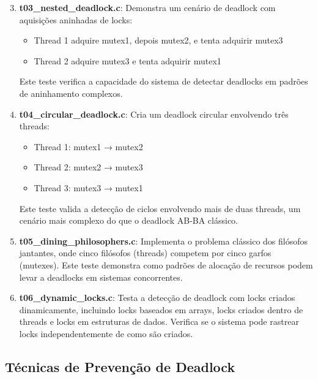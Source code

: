 \begin{enumerate}\setcounter{enumi}{2}
    \item \textbf{t03\_nested\_deadlock.c}: Demonstra um cenário de deadlock com aquisições aninhadas de locks:
    \begin{itemize}
        \item Thread 1 adquire mutex1, depois mutex2, e tenta adquirir mutex3
        \item Thread 2 adquire mutex3 e tenta adquirir mutex1
    \end{itemize}
    Este teste verifica a capacidade do sistema de detectar deadlocks em padrões de aninhamento complexos.

    \item \textbf{t04\_circular\_deadlock.c}: Cria um deadlock circular envolvendo três threads:
    \begin{itemize}
        \item Thread 1: mutex1 → mutex2
        \item Thread 2: mutex2 → mutex3
        \item Thread 3: mutex3 → mutex1
    \end{itemize}
    Este teste valida a detecção de ciclos envolvendo mais de duas threads, um cenário mais complexo do que o deadlock AB-BA clássico.

    \item \textbf{t05\_dining\_philosophers.c}: Implementa o problema clássico dos filósofos jantantes, onde cinco filósofos (threads) competem por cinco garfos (mutexes). Este teste demonstra como padrões de alocação de recursos podem levar a deadlocks em sistemas concorrentes.

    \item \textbf{t06\_dynamic\_locks.c}: Testa a detecção de deadlock com locks criados dinamicamente, incluindo locks baseados em arrays, locks criados dentro de threads e locks em estruturas de dados. Verifica se o sistema pode rastrear locks independentemente de como são criados.
\end{enumerate}

\subsection{Técnicas de Prevenção de Deadlock}

